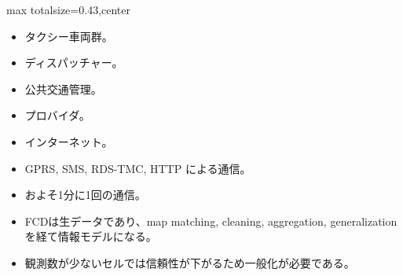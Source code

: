 \clearpage
{}
\begin{minipage}[t]{0.405\textwidth}
\begin{adjustbox}{max totalsize={\textwidth}{0.43\textheight},center}
\begin{minipage}{\textwidth}\scriptsize
{}\begin{itemize}
\item タクシー車両群。
\item ディスパッチャー。
\item 公共交通管理。
\item プロバイダ。
\item インターネット。
\item GPRS, SMS, RDS-TMC, HTTP による通信。
\item およそ1分に1回の通信。
\end{itemize}\begin{itemize}
\item FCDは生データであり、map matching, cleaning, aggregation, generalization を経て情報モデルになる。
\item 観測数が少ないセルでは信頼性が下がるため一般化が必要である。
\end{itemize}
\end{minipage}
\end{adjustbox}
\end{minipage}\hfill
